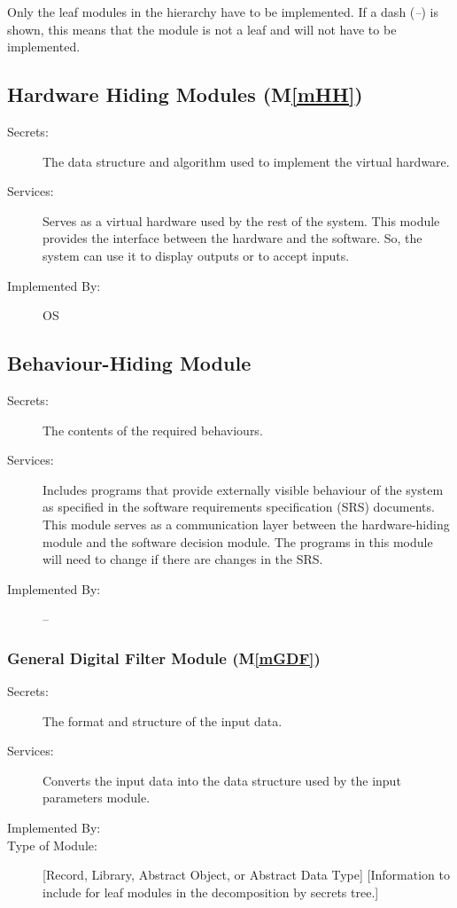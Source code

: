 \documentclass[12pt, titlepage]{article}
\newcommand{\mref}[1]{M\ref{#1}}
\begin{document}
Only the leaf modules in the hierarchy have to be implemented. If a dash
(\emph{--}) is shown, this means that the module is not a leaf and will not have
to be implemented.

\subsection{Hardware Hiding Modules (\mref{mHH})}

\begin{description}
\item[Secrets:]The data structure and algorithm used to implement the virtual
  hardware.
\item[Services:]Serves as a virtual hardware used by the rest of the system.
  This module provides the interface between the hardware and the software. So,
  the system can use it to display outputs or to accept inputs.
\item[Implemented By:] OS
\end{description}

\subsection{Behaviour-Hiding Module}

\begin{description}
\item[Secrets:]The contents of the required behaviours.
\item[Services:]Includes programs that provide externally visible behaviour of
  the system as specified in the software requirements specification (SRS)
  documents. This module serves as a communication layer between the
  hardware-hiding module and the software decision module. The programs in this
  module will need to change if there are changes in the SRS.
\item[Implemented By:] --
\end{description}

\subsubsection{General Digital Filter Module (\mref{mGDF})}

\begin{description}
\item[Secrets:]The format and structure of the input data.
\item[Services:]Converts the input data into the data structure used by the
  input parameters module.
\item[Implemented By:] \progname
\item[Type of Module:] [Record, Library, Abstract Object, or Abstract Data Type]
  [Information to include for leaf modules in the decomposition by secrets
  tree.]
\end{description}
\end{document}
